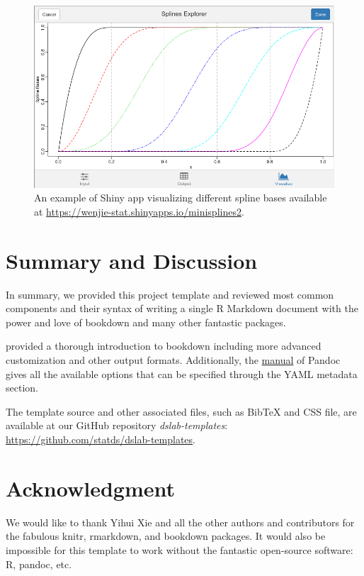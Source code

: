 \documentclass[11pt,letterpaper,]{article}
\newcommand{\pkg}[1]{{\normalfont\fontseries{b}\selectfont #1}}
\let\proglang=\textsf
\theoremstyle{definition}
\theoremstyle{definition}
\theoremstyle{definition}
\theoremstyle{remark}
\begin{document}
\begin{figure}

{\centering \includegraphics[width=0.9\linewidth]{figs/webshot_miniSplines2} 

}

\caption{An example of Shiny app visualizing different spline
bases available at \url{https://wenjie-stat.shinyapps.io/minisplines2}.}\label{fig:miniappPdf}
\end{figure}

\hypertarget{sec:summary}{%
\section{Summary and Discussion}\label{sec:summary}}

In summary, we provided this project template and reviewed most common
components and their syntax of writing a single \proglang{R Markdown}
document with the power and love of \pkg{bookdown} and many other
fantastic packages.

\citet{xie2017bookdown} provided a thorough introduction to
\pkg{bookdown} including more advanced customization and other output
formats. Additionally, the \href{http://pandoc.org/MANUAL.html}{manual}
of \pkg{Pandoc} gives all the available options that can be specified
through the \proglang{YAML} metadata section.

The template source and other associated files, such as BibTeX and CSS
file, are available at our GitHub repository \emph{dslab-templates}:
\url{https://github.com/statds/dslab-templates}.

\hypertarget{acknowledgment}{%
\section*{Acknowledgment}\label{acknowledgment}}

We would like to thank Yihui Xie and all the other authors and
contributors for the fabulous \pkg{knitr}, \pkg{rmarkdown}, and
\pkg{bookdown} packages. It would also be impossible for this template
to work without the fantastic open-source software: \proglang{R},
\pkg{pandoc}, etc.

\renewcommand\refname{Reference}


\end{document}
